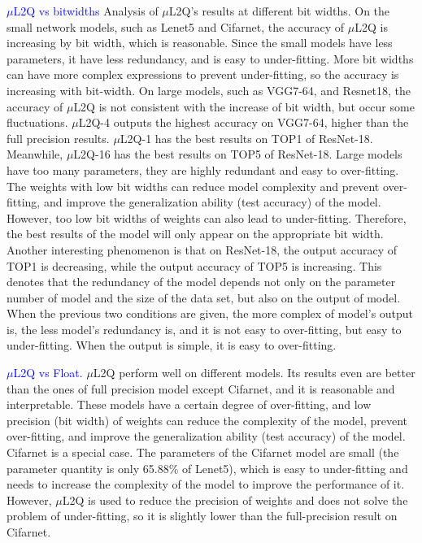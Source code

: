 \textcolor{blue}{$\mu$L2Q vs bitwidths} Analysis of $\mu$L2Q's results at different bit widths.
On the small network models, such as Lenet5 and Cifarnet, the accuracy of $\mu$L2Q is increasing by bit width, which is reasonable. Since the small models have less parameters, it have less redundancy,  and is easy to under-fitting. More bit widths can have more complex expressions to prevent under-fitting, so the accuracy is increasing with bit-width.
On large models, such as VGG7-64, and Resnet18, the accuracy of $\mu$L2Q is not consistent with the increase of bit width, but occur some fluctuations. $\mu$L2Q-4 outputs the highest accuracy on VGG7-64,  higher than the full precision results. $\mu$L2Q-1 has the best results on TOP1 of ResNet-18. Meanwhile, $\mu$L2Q-16 has the best results on TOP5 of ResNet-18. Large models have too many parameters, they are highly redundant and easy to over-fitting. The weights with low bit widths can reduce model complexity and prevent over-fitting,  and improve the generalization ability (test accuracy) of the model. However, too low bit widths of weights can also lead to under-fitting. Therefore, the best results of the model will only appear on the appropriate bit width.
Another interesting phenomenon is that on ResNet-18, the output accuracy of TOP1 is decreasing, while the output accuracy of TOP5 is increasing. This denotes that the redundancy of the model depends not only on the parameter number of model and the size of the data set, but also on the output of model. When the previous two conditions are given, the more complex of model's output is, the less model's redundancy is, and it is not easy to over-fitting, but easy to under-fitting. When the output is simple, it is easy to over-fitting.

\textcolor{blue}{$\mu$L2Q vs Float.}
$\mu$L2Q perform well on different models. Its results even are better than the ones of full precision model except Cifarnet, and it is reasonable and interpretable. These models have a certain degree of over-fitting, and low precision (bit width) of weights can reduce the complexity of the model, prevent over-fitting, and improve the generalization ability (test accuracy) of the model. Cifarnet is a special case. The parameters of the Cifarnet model are small (the parameter quantity is only 65.88\% of Lenet5), which is easy to under-fitting and needs to increase the complexity of the model to improve the performance of it. However, $\mu$L2Q is used to reduce the precision of weights and does not solve the problem of under-fitting, so it is slightly lower than the full-precision result on Cifarnet. 

